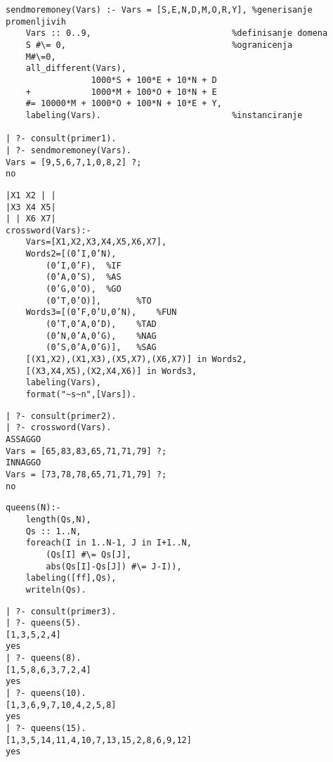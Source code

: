 \documentclass[../main.tex]{subfiles}
\begin{document}
\begin{boxprimer}
\begin{Verbatim}
sendmoremoney(Vars) :- Vars = [S,E,N,D,M,O,R,Y], %generisanje promenljivih
	Vars :: 0..9,                            %definisanje domena
	S #\= 0,                                 %ogranicenja
	M#\=0,
	all_different(Vars),
	             1000*S + 100*E + 10*N + D
	+            1000*M + 100*O + 10*N + E
	#= 10000*M + 1000*O + 100*N + 10*E + Y,
	labeling(Vars).                          %instanciranje

| ?- consult(primer1).
| ?- sendmoremoney(Vars).
Vars = [9,5,6,7,1,0,8,2] ?;
no
\end{Verbatim}
\end{boxprimer}

\begin{boxprimer}
\begin{multicols}{2}
\begin{Verbatim}
|X1 X2 | |
|X3 X4 X5|
| | X6 X7|
crossword(Vars):-
	Vars=[X1,X2,X3,X4,X5,X6,X7],
	Words2=[(0’I,0’N),
		(0’I,0’F),	%IF
		(0’A,0’S),	%AS
		(0’G,0’O),	%GO
		(0’T,0’O)],       %TO
	Words3=[(0’F,0’U,0’N),    %FUN
		(0’T,0’A,0’D),    %TAD
		(0’N,0’A,0’G),    %NAG
		(0’S,0’A,0’G)],   %SAG
	[(X1,X2),(X1,X3),(X5,X7),(X6,X7)] in Words2,
	[(X3,X4,X5),(X2,X4,X6)] in Words3,
	labeling(Vars),
	format("~s~n",[Vars]).
\end{Verbatim}
\columnbreak
\begin{Verbatim}
| ?- consult(primer2).
| ?- crossword(Vars).
ASSAGGO
Vars = [65,83,83,65,71,71,79] ?;
INNAGGO
Vars = [73,78,78,65,71,71,79] ?;
no
\end{Verbatim}
\end{multicols}
\end{boxprimer}

\begin{boxprimer}
\begin{multicols}{2}
\begin{Verbatim}
queens(N):-
	length(Qs,N),
	Qs :: 1..N,
	foreach(I in 1..N-1, J in I+1..N,
		(Qs[I] #\= Qs[J],
		abs(Qs[I]-Qs[J]) #\= J-I)),
	labeling([ff],Qs),
	writeln(Qs).
\end{Verbatim}
\columnbreak
\begin{Verbatim}
| ?- consult(primer3).
| ?- queens(5).
[1,3,5,2,4]
yes
| ?- queens(8).
[1,5,8,6,3,7,2,4]
yes
| ?- queens(10).
[1,3,6,9,7,10,4,2,5,8]
yes
| ?- queens(15).
[1,3,5,14,11,4,10,7,13,15,2,8,6,9,12]
yes
\end{Verbatim}
\end{multicols}
\end{boxprimer}
\end{document}
